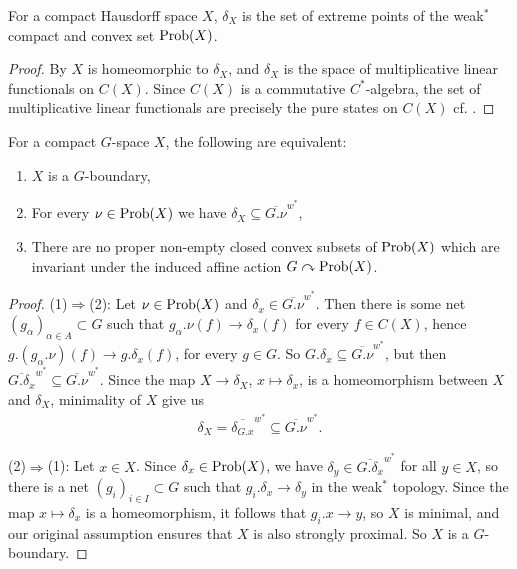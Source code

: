 \begin{lemma} \label{extremepointProb}
For a compact Hausdorff space $X$, $\delta_X$ is the set of extreme points of the weak$^*$ compact and convex set $\operatorname{Prob}(X)$.
\begin{proof}
By \cite[Theorem 6.2][35]{zhu} $X$ is homeomorphic to $\delta_X$, and $\delta_X$ is the space of multiplicative linear functionals on $C(X)$. Since $C(X)$ is a commutative $C^*$-algebra, the set of multiplicative linear functionals are precisely the pure states on $C(X)$ cf. \cite[Exercise 13.3 and 13.4][83]{zhu}.
\end{proof}
\end{lemma}

\begin{proposition}\label{equiv g bound}
For a compact $G$-space $X$, the following are equivalent:
\begin{enumerate}
\item $X$ is a $G$-boundary,
\item For every $\nu \in \operatorname{Prob}(X)$ we have $\delta_X\subseteq \overline{G.\nu}^{w^*}$,
\item There are no proper non-empty closed convex subsets of $\operatorname{Prob}(X)$ which are invariant under the induced affine action $G \curvearrowright \operatorname{Prob}(X)$.
\end{enumerate}
\begin{proof}
\noindent (1)$\Rightarrow$(2): Let $\nu \in \operatorname{Prob}(X)$ and $\delta_{x}\in \overline{G.\nu}^{w^*}$. Then there is some net $(g_{\alpha})_{\alpha \in A} \subset G$ such that $g_{\alpha}.\nu(f) \to \delta_{x}(f)$ for every $f \in C(X)$, hence $g.(g_{\alpha}.\nu)(f) \to g.\delta_{x}(f)$, for every $g \in G$. So $G.\delta_{x} \subseteq \overline{G.\nu}^{w^*}$, but then $\overline{G.\delta_{x}}^{w^*}\subseteq \overline{G.\nu}^{w^*}$. Since the map $X \to \delta_X$, $x \mapsto \delta_{x}$, is a homeomorphism between $X$ and $\delta_X$, minimality of $X$ give us
\begin{align*}
\delta_X=\overline{\delta_{G.x}}^{w^*} \subseteq \overline{G.\nu}^{w^*}.
\end{align*} 

\noindent (2)$\Rightarrow$(1): Let $x \in X$. Since $\delta_{x}\in \text{Prob}(X)$, we have $\delta_{y} \in \overline{G.\delta_{x}}^{w^*}$ for all $y \in X$, so there is a net $(g_{i})_{i \in I} \subset G$ such that $g_{i}. \delta_{x} \to \delta_{y}$ in the weak$^*$ topology. Since the map $x \mapsto \delta_x$ is a homeomorphism, it follows that $g_i.x \to y$, so $X$ is minimal, and our original assumption ensures that $X$ is also strongly proximal. So $X$ is a $G$-boundary.


\end{proof}
\end{proposition}
